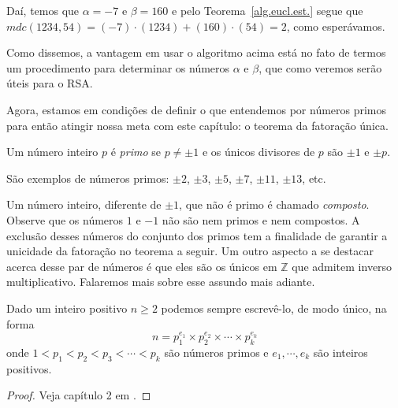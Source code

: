 Da\'{i}, temos que $\alpha=-7$ e $\beta=160$ e pelo Teorema~\ref{alg.eucl.est.} segue que
$mdc(1234,54)=(-7)\cdot(1234)+(160)\cdot(54)=2$, como esper\'{a}vamos.

Como dissemos, a vantagem em usar o algoritmo acima est\'{a} no fato de termos um procedimento para determinar os n\'{u}meros
$\alpha$ e $\beta$, que como veremos ser\~{a}o \'{u}teis para o RSA.

Agora, estamos em condi\c{c}\~{o}es de definir o que entendemos por n\'umeros primos para ent\~ao atingir nossa meta com este 
cap\'itulo: o teorema da fatora\c{c}\~ao \'unica.

\begin{Df}
Um n\'umero inteiro $p$ \'e \textit{primo} se $p\neq \pm 1$ e os \'unicos divisores de $p$ s\~ao $\pm 1$ e $\pm p$. 
\end{Df} 

S\~ao exemplos de n\'umeros primos: $\pm 2$, $\pm 3$, $\pm 5$, $\pm 7$, $\pm 11$, $\pm 13$, etc.

Um n\'umero inteiro, diferente de $\pm 1$, que n\~ao \'e primo \'e chamado \textit{composto}. Observe que os n\'umeros $1$ e $-1$ n\~ao s\~ao nem primos e nem compostos. A exclus\~ao desses n\'umeros do conjunto dos primos tem a finalidade de garantir a unicidade da fatora\c{c}\~ao no teorema a seguir. Um outro aspecto a se destacar acerca desse par de n\'umeros \'e que eles s\~ao os \'unicos em $\mathbb{Z}$ que admitem inverso multiplicativo. Falaremos mais sobre esse assundo mais adiante.

\begin{Th}
\label{fat.unica} 
Dado um inteiro positivo $n\geq 2$ podemos sempre escrev\^e-lo, de modo \'unico, na forma
$$n=p_{1}^{e_1}\times p_{2}^{e_2}\times\cdots\times p_{k}^{e_k}$$
onde $1<p_1<p_2<p_3<\cdots<p_k$ s\~ao n\'umeros primos e $e_1, \cdots, e_k$ s\~ao inteiros positivos.
\end{Th}
\begin{proof}
	Veja cap\'{i}tulo 2 em \cite{cou:2014}.
\end{proof}

